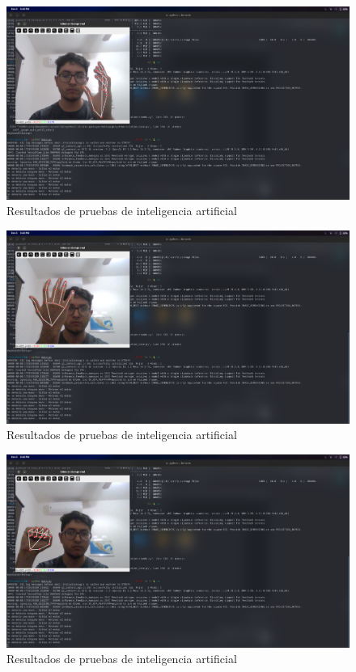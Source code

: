 \begin{figure}[H]
    \centering
    \includegraphics[width=1\textwidth]{img/PruebaIA2.png}
    \caption{Resultados de pruebas de inteligencia artificial}
    \label{fig:ai-test2}
\end{figure}

\begin{figure}[H]
    \centering
    \includegraphics[width=1\textwidth]{img/PruebaIA3.png}
    \caption{Resultados de pruebas de inteligencia artificial}
    \label{fig:ai-test3}
\end{figure}

\begin{figure}[H]
    \centering
    \includegraphics[width=1\textwidth]{img/PruebaIA4.png}
    \caption{Resultados de pruebas de inteligencia artificial}
    \label{fig:ai-test4}
\end{figure}

